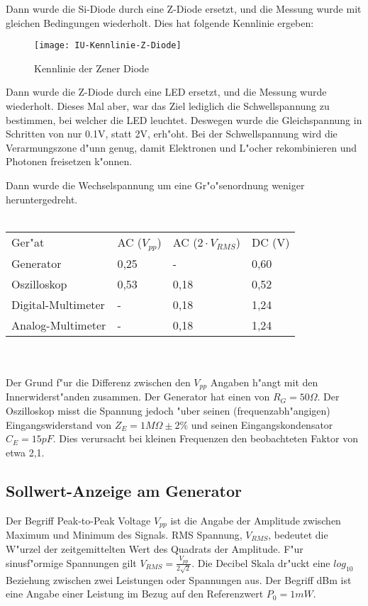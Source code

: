 \documentclass[10pt]{article}
\begin{document}
Dann wurde die Si-Diode durch eine Z-Diode ersetzt, und die Messung wurde mit gleichen Bedingungen wiederholt. Dies hat folgende Kennlinie ergeben: 

\begin{figure}[h!]
  \begin{center}
    \texttt{[image: IU-Kennlinie-Z-Diode]}
    \caption{Kennlinie der Zener Diode}
   \end{center}
\end{figure}

Dann wurde die Z-Diode durch eine LED ersetzt, und die Messung wurde wiederholt. Dieses Mal aber, war das Ziel lediglich die Schwellspannung zu bestimmen, bei welcher die LED leuchtet. Deswegen wurde die Gleichspannung in Schritten von nur 0.1V, statt 2V, erh"oht. Bei der Schwellspannung wird die Verarmungszone d"unn genug, damit Elektronen und L"ocher rekombinieren und Photonen freisetzen k"onnen.

Dann wurde die Wechselspannung um eine Gr"o"senordnung weniger heruntergedreht.\\ \\
\begin{tabular}{l l l l}
Ger"at & AC ($V_{pp}$) & AC ($2 \cdot V_{RMS}$) & DC (V) \\
Generator & 0,25 & - & 0,60 \\
Oszilloskop & 0,53 & 0,18 & 0,52  \\
Digital-Multimeter & - & 0,18 & 1,24  \\
Analog-Multimeter & - & 0,18 & 1,24 \\
\end{tabular}\\\\

Der Grund f"ur die Differenz zwischen den $V_{pp}$ Angaben h"angt mit den Innerwiderst"anden zusammen. Der Generator hat einen von $R_G=50 \Omega$. Der Oszilloskop misst die Spannung jedoch "uber seinen (frequenzabh"angigen) Eingangswiderstand von $Z_E=1 M\Omega \pm 2\%$ und seinen Eingangskondensator $C_E=15 pF$. Dies verursacht bei kleinen Frequenzen den beobachteten Faktor von etwa 2,1.

\subsection{Sollwert-Anzeige am Generator}
Der Begriff Peak-to-Peak Voltage $V_{pp}$ ist die Angabe der Amplitude zwischen Maximum und Minimum des Signals. RMS Spannung, $V_{RMS}$, bedeutet die W"urzel der zeitgemittelten Wert des Quadrats der Amplitude. F"ur sinusf"ormige Spannungen gilt $V_{RMS}=\frac{V_{pp}}{2 \sqrt{2}}$. Die Decibel Skala dr"uckt eine $log_{10}$ Beziehung zwischen zwei Leistungen oder Spannungen aus. Der Begriff dBm ist eine Angabe einer Leistung im Bezug auf den Referenzwert $P_0=1mW$.\\
\end{document}
